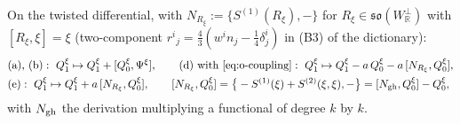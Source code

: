 \begin{proposition}
\begin{itemize}
\end{itemize}
On the twisted differential, with $N_{R_\xi}:=\{S^{(1)}(R_\xi),-\}$ for $R_\xi\in\mathfrak{so}(W_{\mathbb R}^\perp)$ with $[R_\xi,\xi]=\xi$ (two-component $r^i{}_j=\tfrac43(w^in_j-\tfrac14\delta^i_j)$ in (B3) of the dictionary):
\begin{equation}
\begin{aligned}
&\text{(a), (b)}:\ Q_1^\xi\mapsto Q_1^\xi+[Q_0^\xi,\Psi^\xi],\qquad \text{(d) with \eqref{eq:o-coupling}}:\ Q_1^\xi\mapsto Q_1^\xi-a\,Q_0^\xi-a\,[N_{R_\xi},Q_0^\xi],\\
&\text{(e)}:\ Q_1^\xi\mapsto Q_1^\xi+a\,[N_{R_\xi},Q_0^\xi],\qquad [N_{R_\xi},Q_0^\xi]=\big\{-S^{(1)}(\xi)+S^{(2)}(\xi,\xi),-\big\}=[N_{\rm gh},Q_0^\xi]-Q_0^\xi ,
\end{aligned}
\label{eq:o-twistlaws}
\end{equation}
with $N_{\rm gh}$ the derivation multiplying a functional of degree $k$ by $k$.
\end{proposition}

